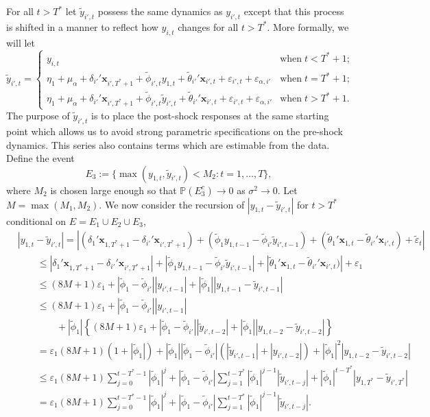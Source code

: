 \documentclass[11pt]{article}
\newcommand{\x}{\textbf{x}}
\newcommand{\Prob}{\mathbb{P}}
\theoremstyle{definition}
\begin{document}
For all $t > T^*$ let $\tilde y_{i',t}$ possess the same dynamics as $y_{i',t}$ except that this process is shifted in a manner to reflect how $y_{i,t}$ changes for all $t > T^*$. More formally, we will let 
$$
  \tilde y_{i',t} = \left\{\begin{array}{cc}
  y_{i,t} & \text{when} \; t < T^*+1; \\ 
  \eta_1 + \mu_\alpha + \delta_{i'}' \x_{i',T^*+1} + \tilde\phi_{i',t}y_{1,t} + \tilde\theta_{i'}'\x_{i',t} + \varepsilon_{i',t} + \varepsilon_{\alpha,i'} & \text{when} \; t = T^* + 1; \\
  \eta_1 + \mu_\alpha + \delta_{i'}' \x_{i',T^*+1} + \tilde\phi_{i',t}\tilde y_{i',t} + \tilde\theta_{i'}'\x_{i',t} + \varepsilon_{i',t} + \varepsilon_{\alpha,i'} & \text{when} \; t > T^* + 1.
\end{array}\right.	
$$
The purpose of $\tilde y_{i',t}$ is to place the post-shock responses at the same starting point which allows us to avoid strong parametric specifications on the pre-shock dynamics. This series also contains terms which are estimable from the data. Define the event 
$$
  E_3 := \{\max\left(y_{1,t},\tilde y_{i',t}\right) < M_2 : t = 1,\ldots,T\}, 
$$
where $M_2$ is chosen large enough so that $\Prob(E_3^c) \to 0$ as $\sigma^2 \to 0$. Let $M = \max(M_1,M_2).$ We now consider the recursion of $|y_{1,t} - \tilde{y}_{i',t}|$ for $t > T^*$ conditional on $E = E_1 \cup E_2 \cup E_3$, 
\begin{align*}
	&|y_{1,t} - \tilde{y}_{i',t}| 
		= |(\delta_1'\x_{1,T^*+1} - \delta_{i'}'\x_{i',T^*+1})
		+ (\tilde\phi_{1}y_{1,t-1} - \tilde\phi_{i'}\tilde{y}_{i',t-1}) 
		+ (\tilde\theta_{1}'\x_{1,t} - \tilde\theta_{i'}'\x_{i',t}) + \tilde\varepsilon_t| \\
	&\qquad \leq |\delta_1'\x_{1,T^*+1} - \delta_{i'}'\x_{i',T^*+1}|
		+ |\tilde\phi_{1}y_{1,t-1} - \tilde\phi_{i'}\tilde{y}_{i',t-1}| 
		+ |\tilde\theta_{1}'\x_{1,t} - \tilde\theta_{i'}'\x_{i',t})| 
		+ \varepsilon_1 \\
	&\qquad\leq (8M + 1)\varepsilon_1 + |\tilde\phi_{1} - \tilde\phi_{i'}||y_{i',t-1}| + |\tilde\phi_1||y_{1,t-1} - \tilde{y}_{i',t-1}| \\
	&\qquad\leq (8M + 1)\varepsilon_1 + |\tilde\phi_{1} - \tilde\phi_{i'}||y_{i',t-1}| \\ 
	&\qquad\qquad+ |\tilde\phi_1|\left\{(8M + 1)\varepsilon_1 + |\tilde\phi_{1} - \tilde\phi_{i'}||\tilde{y}_{i',t-2}| + |\tilde\phi_1||y_{1,t-2} - \tilde{y}_{i',t-2}|\right\} \\
	&\qquad= \varepsilon_1(8M + 1)(1 + |\tilde\phi_1|) + |\tilde\phi_1||\tilde\phi_{1} - \tilde\phi_{i'}|(|\tilde{y}_{i',t-1}| + |y_{i',t-2}|) + |\tilde\phi_1|^2|y_{1,t-2} - \tilde{y}_{i',t-2}| \\
	&\qquad \leq \varepsilon_1(8M + 1)\sum_{j=0}^{t-T^*-1}|\tilde\phi_1|^j + |\tilde\phi_{1} - \tilde\phi_{i'}|\sum_{j=1}^{t-T^*}|\tilde\phi_1|^{j-1}|\tilde{y}_{i',t-j}| + |\tilde\phi_1|^{t-T^*}|y_{1,T^*} - \tilde{y}_{i',T^*}| \\
	&\qquad = \varepsilon_1(8M + 1)\sum_{j=0}^{t-T^*-1}|\tilde\phi_1|^j + |\tilde\phi_{1} - \tilde\phi_{i'}|\sum_{j=1}^{t-T^*}|\tilde\phi_1|^{j-1}|\tilde{y}_{i',t-j}|.
\end{align*}
\end{document}
